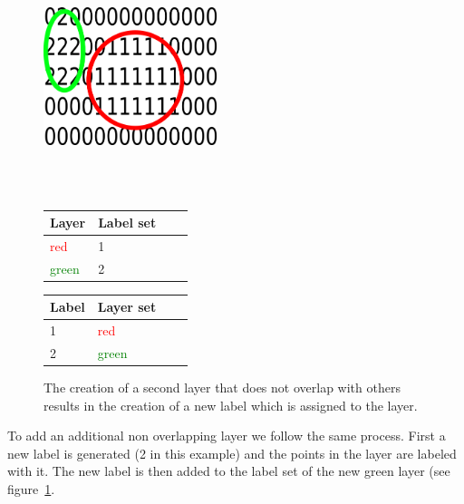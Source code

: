 \begin{figure}[ht]
	\begin{minipage}[b]{\linewidth}
		\centering
		\includegraphics[width=0.45\textwidth]{images/layers3}
	\end{minipage}
	\\\\
	\begin{minipage}[b]{0.49\linewidth}
		\hfill
		\begin{tabular}[b]{|l|l|l|l|}
			\hline
			Layer & Label set \\
			\hline
			\textcolor{red}{red}       & 1 \\
			\textcolor{green}{green}       & 2 \\
			\hline
		\end{tabular}
	\end{minipage}
	\hspace{0.5cm}
	\begin{minipage}[b]{0.5\linewidth}
		\begin{tabular}[b]{|l|l|l|l|}
			\hline
			Label & Layer set \\
			\hline
			1       & \textcolor{red}{red} \\
			2       & \textcolor{green}{green} \\
			\hline
		\end{tabular}
		\hfill
	\end{minipage}
	\caption[Two non overlapping layers]{ The creation of a second layer that does not overlap with others results in the creation of a new label which is assigned to the layer. \label{fig:layer3}}
\end{figure}

To add an additional non overlapping layer we follow the same process. First a new label is generated (2 in this example) and the points in the layer are labeled with it. The new label is then added to the label set of the new green layer (see figure~\ref{fig:layer3}.



